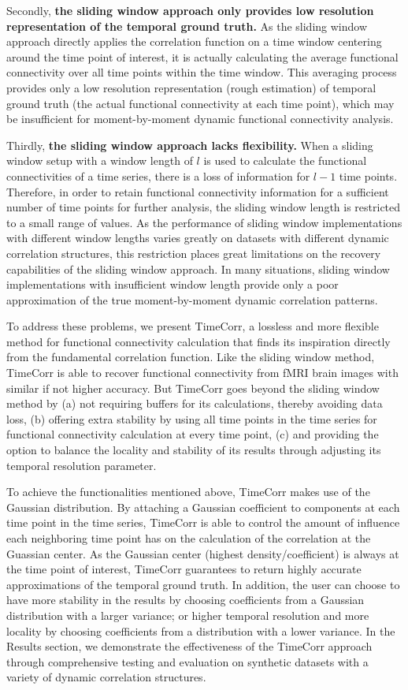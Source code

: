 \documentclass[11pt]{article}
\begin{document}
Secondly, \textbf{the sliding window approach only provides low resolution representation of the temporal ground truth.} As the sliding window approach directly applies the correlation function on a time window centering around the time point of interest, it is actually calculating the average functional connectivity over all time points within the time window. This averaging process provides only a low resolution representation (rough estimation) of temporal ground truth (the actual functional connectivity at each time point), which may be insufficient for moment-by-moment dynamic functional connectivity analysis.

Thirdly, \textbf{the sliding window approach lacks flexibility.} When a sliding window setup with a window length of $l$ is used to calculate the functional connectivities of a time series, there is a loss of information for $l-1$ time points. Therefore, in order to retain functional connectivity information for a sufficient number of time points for further analysis, the sliding window length is restricted to a small range of values. As the performance of sliding window implementations with different window lengths varies greatly on datasets with different dynamic correlation structures, this restriction places great limitations on the recovery capabilities of the sliding window approach. In many situations, sliding window implementations with insufficient window length provide only a poor approximation of the true moment-by-moment dynamic correlation patterns.

To address these problems, we present TimeCorr, a lossless and more flexible method for functional connectivity calculation that finds its inspiration directly from the fundamental correlation function. Like the sliding window method, TimeCorr is able to recover functional connectivity from fMRI brain images with similar if not higher accuracy. But TimeCorr goes beyond the sliding window method by (a) not requiring buffers for its calculations, thereby avoiding data loss, (b) offering extra stability by using all time points in the time series for functional connectivity calculation at every time point, (c) and providing the option to balance the locality and stability of its results through adjusting its temporal resolution parameter.

To achieve the functionalities mentioned above, TimeCorr makes use of the Gaussian distribution. By attaching a Gaussian coefficient to components at each time point in the time series, TimeCorr is able to control the amount of influence each neighboring time point has on the calculation of the correlation at the Guassian center. As the Gaussian center (highest density/coefficient) is always at the time point of interest, TimeCorr guarantees to return highly accurate approximations of the temporal ground truth. In addition, the user can choose to have more stability in the results by choosing coefficients from a Gaussian distribution with a larger variance; or higher temporal resolution and more locality by choosing coefficients from a distribution with a lower variance. In the Results section, we demonstrate the effectiveness of the TimeCorr approach through comprehensive testing and evaluation on synthetic datasets with a variety of dynamic correlation structures.
\end{document}
